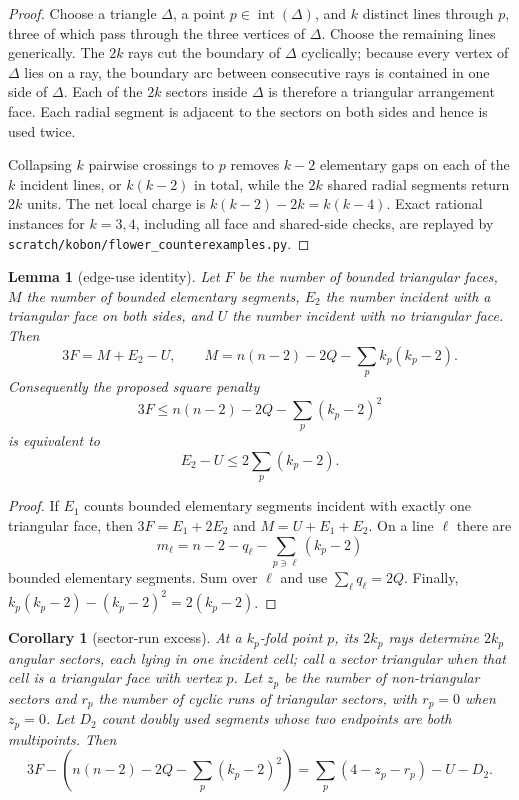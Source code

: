 \documentclass[11pt]{article}
\newtheorem{lemma}[theorem]{Lemma}
\newtheorem{corollary}[theorem]{Corollary}
\theoremstyle{definition}
\newcommand{\intr}{\operatorname{int}}
\begin{document}
\begin{proof}
Choose a triangle $\Delta$, a point $p\in\intr(\Delta)$, and $k$ distinct
lines through $p$, three of which pass through the three vertices of
$\Delta$. Choose the remaining lines generically. The $2k$ rays cut the
boundary of $\Delta$ cyclically; because every vertex of $\Delta$ lies on a
ray, the boundary arc between consecutive rays is contained in one side of
$\Delta$. Each of the $2k$ sectors inside $\Delta$ is therefore a triangular
arrangement face. Each radial segment is adjacent to the sectors on both
sides and hence is used twice.

Collapsing $k$ pairwise crossings to $p$ removes $k-2$ elementary gaps on
each of the $k$ incident lines, or $k(k-2)$ in total, while the $2k$ shared
radial segments return $2k$ units. The net local charge is
$k(k-2)-2k=k(k-4)$. Exact rational instances for $k=3,4$, including all
face and shared-side checks, are replayed by
\texttt{scratch/kobon/flower\_counterexamples.py}.
\end{proof}
\begin{lemma}[edge-use identity]\label{lem:edgeaccount}
Let $F$ be the number of bounded triangular faces, $M$ the number of bounded
elementary segments, $E_2$ the number incident with a triangular face on both
sides, and $U$ the number incident with no triangular face. Then
\[
 3F=M+E_2-U,\qquad
 M=n(n-2)-2Q-\sum_p k_p(k_p-2).
\]
Consequently the proposed square penalty
\[
 3F\le n(n-2)-2Q-\sum_p(k_p-2)^2
\]
is equivalent to
\[
 E_2-U\le 2\sum_p(k_p-2).
\]
\end{lemma}

\begin{proof}
If $E_1$ counts bounded elementary segments incident with exactly one
triangular face, then $3F=E_1+2E_2$ and $M=U+E_1+E_2$. On a line $\ell$ there
are
\[
 m_\ell=n-2-q_\ell-\sum_{p\ni\ell}(k_p-2)
\]
bounded elementary segments. Sum over $\ell$ and use
$\sum_\ell q_\ell=2Q$. Finally,
$k_p(k_p-2)-(k_p-2)^2=2(k_p-2)$.
\end{proof}
\begin{corollary}[sector-run excess]\label{cor:sectorexcess}
At a $k_p$-fold point $p$, its $2k_p$ rays determine $2k_p$ angular
sectors, each lying in one incident cell; call a sector triangular when that
cell is a triangular face with vertex $p$. Let $z_p$ be the number of
non-triangular sectors and $r_p$ the number of cyclic runs of triangular
sectors, with $r_p=0$ when $z_p=0$. Let $D_2$ count doubly used segments
whose two endpoints are both multipoints. Then
\[
 3F-\left(n(n-2)-2Q-\sum_p(k_p-2)^2\right)
 =\sum_p(4-z_p-r_p)-U-D_2.
\]
\end{corollary}
\end{document}
